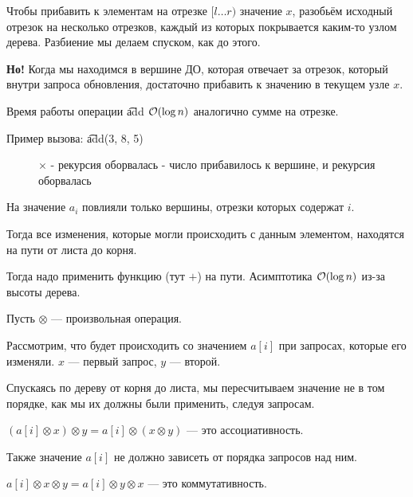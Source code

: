 Чтобы прибавить к элементам на отрезке $[l \ldots r)$ значение $x$, разобьём исходный отрезок на несколько отрезков, каждый из которых покрывается каким-то узлом дерева. Разбиение мы делаем спуском, как до этого.

{\bf Но!} Когда мы находимся в вершине ДО, которая отвечает за отрезок, который внутри запроса обновления, достаточно прибавить к значению в текущем узле $x$.

Время работы операции \t{add} $ \mathcal{O}(\log n)$ аналогично сумме на отрезке.
\down

Пример вызова: \t{add(3, 8, 5)}
\up \up
\begin{center}
	\begin{figure}[h]
		\captionsetup{font=small, labelformat=empty}
		\caption{$\times$ - рекурсия оборвалась \checkmark - число прибавилось к вершине, и рекурсия оборвалась}
		\label{fig:image}
	\end{figure}
\end{center}


На значение $a_i$ повлияли только вершины, отрезки которых содержат $i$.

Тогда все изменения, которые могли происходить с данным элементом, находятся на пути от листа до корня. 

Тогда надо применить функцию (тут $+$) на пути. Асимптотика $\mathcal{O}(\log n)$ из-за высоты дерева.


Пусть $\otimes$ --- произвольная операция.

Рассмотрим, что будет происходить со значением $a[i]$ при запросах, которые его изменяли. $x$ --- первый запрос, $y$ --- второй.
\down

Спускаясь по дереву от корня до листа, мы пересчитываем значение не в том порядке, как мы их должны были применить, следуя запросам.

$(a[i] \otimes x) \otimes y = a[i] \otimes (x \otimes y)$ --- это ассоциативность.

Также значение $a[i]$ не должно зависеть от порядка запросов над ним.

$a[i] \otimes x \otimes y = a[i] \otimes y \otimes x$ --- это коммутативность.

